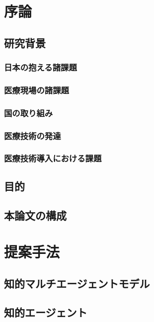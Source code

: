 \chapter{序論}

\section{研究背景}

\subsection{日本の抱える諸課題}

\subsection{医療現場の諸課題}

\subsection{国の取り組み}

\subsection{医療技術の発達}

\subsection{医療技術導入における課題}

\section{目的}

\section{本論文の構成}

\chapter{提案手法}

\section{知的マルチエージェントモデル}

\section{知的エージェント}

